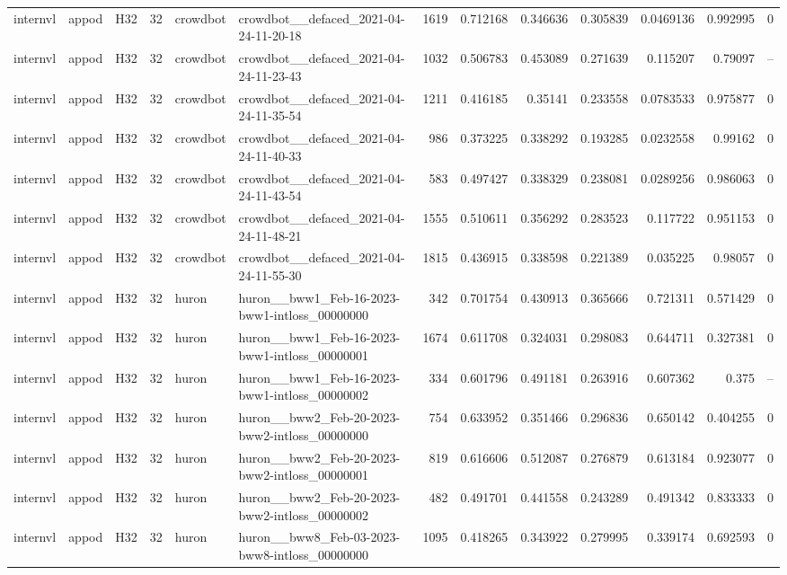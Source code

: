 \begin{longtable}{lllrllrrrrrrr}
internvl & appod & H32 & 32 & crowdbot & crowdbot\_\_defaced\_2021-04-24-11-20-18 & 1619 & 0.712168 & 0.346636 & 0.305839 & 0.0469136 & 0.992995 & 0 \\
internvl & appod & H32 & 32 & crowdbot & crowdbot\_\_defaced\_2021-04-24-11-23-43 & 1032 & 0.506783 & 0.453089 & 0.271639 & 0.115207 & 0.79097 & -- \\
internvl & appod & H32 & 32 & crowdbot & crowdbot\_\_defaced\_2021-04-24-11-35-54 & 1211 & 0.416185 & 0.35141 & 0.233558 & 0.0783533 & 0.975877 & 0 \\
internvl & appod & H32 & 32 & crowdbot & crowdbot\_\_defaced\_2021-04-24-11-40-33 & 986 & 0.373225 & 0.338292 & 0.193285 & 0.0232558 & 0.99162 & 0 \\
internvl & appod & H32 & 32 & crowdbot & crowdbot\_\_defaced\_2021-04-24-11-43-54 & 583 & 0.497427 & 0.338329 & 0.238081 & 0.0289256 & 0.986063 & 0 \\
internvl & appod & H32 & 32 & crowdbot & crowdbot\_\_defaced\_2021-04-24-11-48-21 & 1555 & 0.510611 & 0.356292 & 0.283523 & 0.117722 & 0.951153 & 0 \\
internvl & appod & H32 & 32 & crowdbot & crowdbot\_\_defaced\_2021-04-24-11-55-30 & 1815 & 0.436915 & 0.338598 & 0.221389 & 0.035225 & 0.98057 & 0 \\
internvl & appod & H32 & 32 & huron & huron\_\_bww1\_Feb-16-2023-bww1-intloss\_00000000 & 342 & 0.701754 & 0.430913 & 0.365666 & 0.721311 & 0.571429 & 0 \\
internvl & appod & H32 & 32 & huron & huron\_\_bww1\_Feb-16-2023-bww1-intloss\_00000001 & 1674 & 0.611708 & 0.324031 & 0.298083 & 0.644711 & 0.327381 & 0 \\
internvl & appod & H32 & 32 & huron & huron\_\_bww1\_Feb-16-2023-bww1-intloss\_00000002 & 334 & 0.601796 & 0.491181 & 0.263916 & 0.607362 & 0.375 & -- \\
internvl & appod & H32 & 32 & huron & huron\_\_bww2\_Feb-20-2023-bww2-intloss\_00000000 & 754 & 0.633952 & 0.351466 & 0.296836 & 0.650142 & 0.404255 & 0 \\
internvl & appod & H32 & 32 & huron & huron\_\_bww2\_Feb-20-2023-bww2-intloss\_00000001 & 819 & 0.616606 & 0.512087 & 0.276879 & 0.613184 & 0.923077 & 0 \\
internvl & appod & H32 & 32 & huron & huron\_\_bww2\_Feb-20-2023-bww2-intloss\_00000002 & 482 & 0.491701 & 0.441558 & 0.243289 & 0.491342 & 0.833333 & 0 \\
internvl & appod & H32 & 32 & huron & huron\_\_bww8\_Feb-03-2023-bww8-intloss\_00000000 & 1095 & 0.418265 & 0.343922 & 0.279995 & 0.339174 & 0.692593 & 0 \\

\end{longtable}
